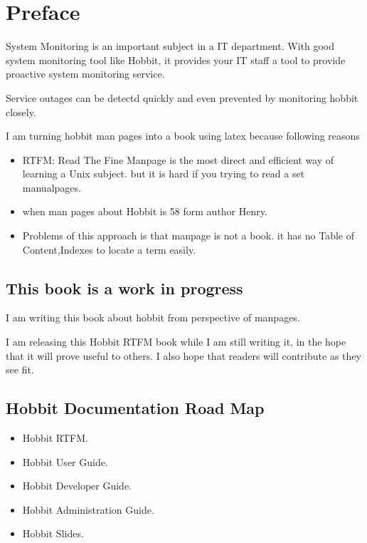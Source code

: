\chapter{Preface}
\label{chap:preface}

System Monitoring is an important subject in a IT department.
With good system monitoring tool like Hobbit, it provides your IT
staff a tool to provide proactive system monitoring service.

Service outages can be detectd quickly and even prevented by monitoring
hobbit closely.

I am turning hobbit man pages into a book using latex because following reasons

\begin{itemize}
\item RTFM: Read The Fine Manpage is the most direct and efficient way of
learning a Unix subject. but it is hard if you trying to read a set manualpages.
\item  when man pages about Hobbit is 58 form author Henry.
\item Problems of this approach is that manpage is not a book. it has no
Table of Content,Indexes to locate a term easily.

\end{itemize}

\section{This book is a work in progress}

I am writing this  book about hobbit from perspective of manpages.  

I am releasing this Hobbit RTFM book while I am still writing it, in the hope that
it will prove useful to others.  I also hope that readers will
contribute as they see fit.

\section{Hobbit Documentation Road Map}


\begin{itemize}
\item Hobbit RTFM.
\item Hobbit User Guide.
\item Hobbit Developer Guide.
\item Hobbit Administration Guide.
\item Hobbit Slides.

\end{itemize}

